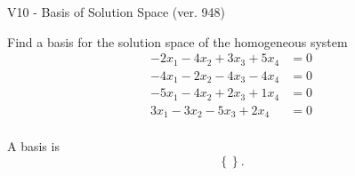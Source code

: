\begin{exercise}
  \begin{exerciseTitle}V10 - Basis of Solution Space (ver. 948)\end{exerciseTitle}
  \begin{exerciseStatement}
    Find a basis for the solution space of the homogeneous system 
\begin{align*}
 -2 x_ 1 -4 x_ 2 + 3 x_ 3 + 5 x_ 4 &= 0  \\ 
  -4 x_ 1 -2 x_ 2 -4 x_ 3 -4 x_ 4 &= 0  \\ 
  -5 x_ 1 -4 x_ 2 + 2 x_ 3 + 1 x_ 4 &= 0  \\ 
  3 x_ 1 -3 x_ 2 -5 x_ 3 + 2 x_ 4 &= 0  \\ 
 \end{align*}


 
  \end{exerciseStatement}

  \begin{exerciseAnswer}
   A basis is   
\[\left\{\right\}.\]

  


  \end{exerciseAnswer}
\end{exercise}